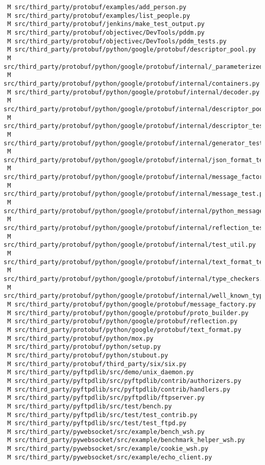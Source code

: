 \documentclass{article}
\begin{document}
\begin{verbatim}
 M src/third_party/protobuf/examples/add_person.py
 M src/third_party/protobuf/examples/list_people.py
 M src/third_party/protobuf/jenkins/make_test_output.py
 M src/third_party/protobuf/objectivec/DevTools/pddm.py
 M src/third_party/protobuf/objectivec/DevTools/pddm_tests.py
 M src/third_party/protobuf/python/google/protobuf/descriptor_pool.py
 M src/third_party/protobuf/python/google/protobuf/internal/_parameterized.py
 M src/third_party/protobuf/python/google/protobuf/internal/containers.py
 M src/third_party/protobuf/python/google/protobuf/internal/decoder.py
 M src/third_party/protobuf/python/google/protobuf/internal/descriptor_pool_test.py
 M src/third_party/protobuf/python/google/protobuf/internal/descriptor_test.py
 M src/third_party/protobuf/python/google/protobuf/internal/generator_test.py
 M src/third_party/protobuf/python/google/protobuf/internal/json_format_test.py
 M src/third_party/protobuf/python/google/protobuf/internal/message_factory_test.py
 M src/third_party/protobuf/python/google/protobuf/internal/message_test.py
 M src/third_party/protobuf/python/google/protobuf/internal/python_message.py
 M src/third_party/protobuf/python/google/protobuf/internal/reflection_test.py
 M src/third_party/protobuf/python/google/protobuf/internal/test_util.py
 M src/third_party/protobuf/python/google/protobuf/internal/text_format_test.py
 M src/third_party/protobuf/python/google/protobuf/internal/type_checkers.py
 M src/third_party/protobuf/python/google/protobuf/internal/well_known_types_test.py
 M src/third_party/protobuf/python/google/protobuf/message_factory.py
 M src/third_party/protobuf/python/google/protobuf/proto_builder.py
 M src/third_party/protobuf/python/google/protobuf/reflection.py
 M src/third_party/protobuf/python/google/protobuf/text_format.py
 M src/third_party/protobuf/python/mox.py
 M src/third_party/protobuf/python/setup.py
 M src/third_party/protobuf/python/stubout.py
 M src/third_party/protobuf/third_party/six/six.py
 M src/third_party/pyftpdlib/src/demo/unix_daemon.py
 M src/third_party/pyftpdlib/src/pyftpdlib/contrib/authorizers.py
 M src/third_party/pyftpdlib/src/pyftpdlib/contrib/handlers.py
 M src/third_party/pyftpdlib/src/pyftpdlib/ftpserver.py
 M src/third_party/pyftpdlib/src/test/bench.py
 M src/third_party/pyftpdlib/src/test/test_contrib.py
 M src/third_party/pyftpdlib/src/test/test_ftpd.py
 M src/third_party/pywebsocket/src/example/bench_wsh.py
 M src/third_party/pywebsocket/src/example/benchmark_helper_wsh.py
 M src/third_party/pywebsocket/src/example/cookie_wsh.py
 M src/third_party/pywebsocket/src/example/echo_client.py

\end{verbatim}
\end{document}
